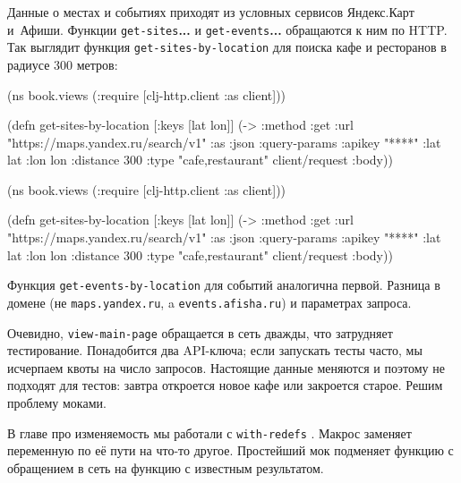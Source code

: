 \fi

Данные о местах и событиях приходят из условных сервисов Яндекс.Карт
и~Афиши. Функции \verb|get-sites|\textbf{...} и \verb|get-events|\textbf{...}
обращаются к ним по HTTP. Так выглядит функция \verb|get-sites-by-location| для
поиска кафе и ресторанов в радиусе 300 метров:


\ifx\DEVICETYPE\MOBILE

\begin{english}
  \begin{clojure}
(ns book.views
  (:require
   [clj-http.client :as client]))

(defn get-sites-by-location
  [{:keys [lat lon]}]
  (-> {:method :get
       :url
       "https://maps.yandex.ru/search/v1"
       :as :json
       :query-params
       {:apikey "****"
        :lat lat :lon lon :distance 300
        :type "cafe,restaurant"}}
      client/request
      :body))
  \end{clojure}
\end{english}

\else

\begin{english}
  \begin{clojure}
(ns book.views
  (:require [clj-http.client :as client]))

(defn get-sites-by-location
  [{:keys [lat lon]}]
  (-> {:method :get
       :url "https://maps.yandex.ru/search/v1"
       :as :json
       :query-params {:apikey "****"
                      :lat lat
                      :lon lon
                      :distance 300
                      :type "cafe,restaurant"}}
      client/request
      :body))
  \end{clojure}
\end{english}

\fi

Функция \verb|get-events-by-location| для событий аналогична первой. Разница в
домене (не \verb|maps.yandex.ru|, a \verb|events.afisha.ru|) и параметрах
запроса.

Очевидно, \verb|view-main-page| обращается в сеть дважды, что затрудняет
тестирование. Понадобится два API-ключа; если запускать тесты часто, мы
исчерпаем квоты на число запросов. Настоящие данные меняются и поэтому не
подходят для тестов: завтра откроется новое кафе или закроется старое. Решим
проблему моками.


В главе про изменяемость мы работали с \verb|with-redefs| .
Макрос заменяет переменную по её пути на что-то другое. Простейший мок подменяет
функцию с обращением в сеть на функцию с известным результатом.


